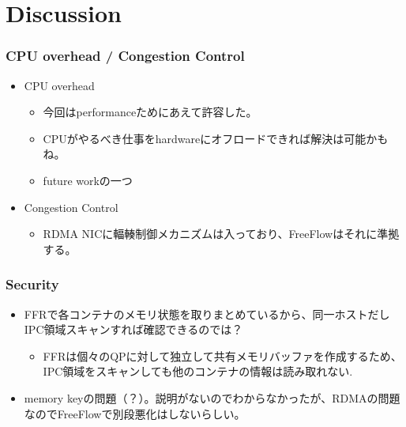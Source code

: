 \documentclass[dvipdfmx,9pt,notheorems]{beamer}
\theoremstyle{definition}
\begin{document}
\section{Discussion}
\begin{frame}\frametitle{CPU overhead / Congestion Control}
	\begin{itemize}
		\item CPU overhead
		\begin{itemize}
			\item 今回はperformanceためにあえて許容した。
			\item CPUがやるべき仕事をhardwareにオフロードできれば解決は可能かもね。
			\item future workの一つ
		\end{itemize}
		\item Congestion Control
		\begin{itemize}
			\item RDMA NICに輻輳制御メカニズムは入っており、FreeFlowはそれに準拠する。
		\end{itemize}
	\end{itemize}
\end{frame}

\begin{frame}\frametitle{Security}
	\begin{itemize}
		\item FFRで各コンテナのメモリ状態を取りまとめているから、同一ホストだしIPC領域スキャンすれば確認できるのでは？
		\begin{itemize}
			\item FFRは個々のQPに対して独立して共有メモリバッファを作成するため、IPC領域をスキャンしても他のコンテナの情報は読み取れない.
		\end{itemize}
		\item memory keyの問題（？）。説明がないのでわからなかったが、RDMAの問題なのでFreeFlowで別段悪化はしないらしい。
	\end{itemize}
\end{frame}
\end{document}
